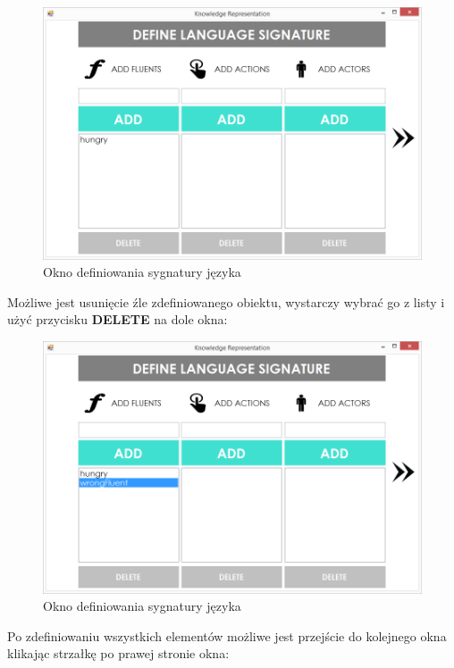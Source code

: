 \documentclass{article}
\begin{document}
\begin{figure}[H]
\centering
\includegraphics[scale=0.4]{03}
\caption{Okno definiowania sygnatury języka}
\end{figure}

Możliwe jest usunięcie źle zdefiniowanego obiektu, wystarczy wybrać go z listy i użyć przycisku \textbf{DELETE} na dole okna:

\begin{figure}[H]
\centering
\includegraphics[scale=0.4]{04}
\caption{Okno definiowania sygnatury języka}
\end{figure}
\newpage

Po zdefiniowaniu wszystkich elementów możliwe jest przejście do kolejnego okna klikając strzałkę po prawej stronie okna:
\end{document}
